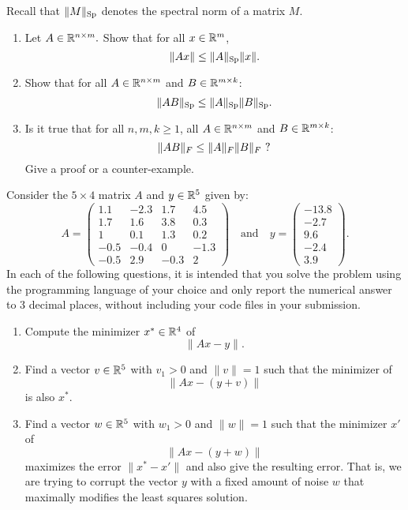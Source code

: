 \documentclass[11pt,nocut]{article}
\begin{document}
\begin{problem}[3 points]
	Recall that $\|M\|_{\rm Sp}$ denotes the spectral norm of a matrix $M$.
	\begin{enumerate}[label=\normalfont(\textbf{\alph*})]
		\item Let $A\in \mathbb{R}^{n \times m}.$ Show that for all $x \in \mathbb{R}^m$,
			$$
			\|Ax\| \leq \|A\|_{\rm Sp} \|x\|.
			$$
		\item Show that for all $A \in \mathbb{R}^{n \times m}$ and $B\in \mathbb{R}^{m \times k}$:
			$$
			\|AB\|_{\rm Sp} \leq \|A\|_{\rm Sp} \|B\|_{\rm Sp}.
			$$
		\item Is it true that for all $n,m,k \geq 1$, all $A \in \mathbb{R}^{n \times m}$ and $B\in \mathbb{R}^{m \times k}$:
			$$
			\|AB\|_{F} \leq \|A\|_{F} \|B\|_{F} \ {\rm ?}
			$$
			Give a proof or a counter-example.
	\end{enumerate}
\end{problem}

\newpage

\begin{problem}[3 points]
 Consider the $5 \times 4$ matrix $A$ and $y \in \mathbb{R}^5$ given by:
$$
A=
\begin{pmatrix}
	1.1 & -2.3 & 1.7 &  4.5\\
	1.7  & 1.6  & 3.8  & 0.3 \\
	1  &  0.1 & 1.3&  0.2\\
	-0.5 & -0.4  & 0 &  -1.3 \\
	-0.5  & 2.9 & -0.3 &  2
\end{pmatrix}
\quad \text{and} \quad
y=
\begin{pmatrix}
	-13.8\\
	-2.7 \\
	9.6 \\
	-2.4 \\
	3.9
\end{pmatrix}
.
$$
In each of the following questions, it is intended that you solve the problem using the programming language of your choice and only report the numerical answer to 3 decimal places, without including your code files in your submission.
\begin{enumerate}[label=\normalfont(\textbf{\alph*})]
	\item Compute the minimizer $x^* \in \mathbb{R}^4$ of 
		$$
		\|Ax-y\|.
		$$
	\item Find a vector $v \in\mathbb{R}^5$ with $v_1 > 0$ and $\|v\|=1$ such that the minimizer of 
		$$
		\|Ax - (y+v)\|
		$$
		is also $x^*$.
	\item Find a vector $w \in \mathbb{R}^5$ with $w_1 >0$ and $\|w\|=1$ such that the minimizer $x'$ of 
		$$
		\|Ax - (y+w)\|
		$$
		maximizes the error $\|x^* - x'\|$ and also	give the resulting error.
		That is, we are trying to corrupt the vector $y$ with a fixed amount of noise $w$ that maximally modifies the least squares solution.
\end{enumerate}
\end{problem}
\end{document}
